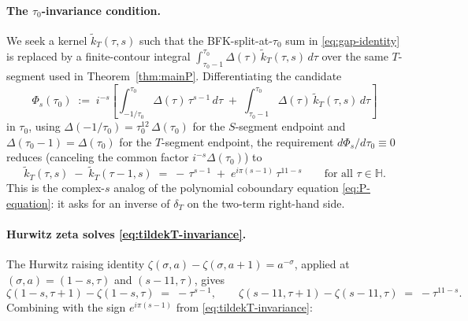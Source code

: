 \documentclass[11pt,letterpaper]{article}
\newcommand{\HH}{\mathbb{H}}
\begin{document}
\paragraph{The $\tau_0$-invariance condition.}
We seek a kernel $\widetilde{k}_T(\tau, s)$ such that the BFK-split-at-$\tau_0$ sum in \eqref{eq:gap-identity} is replaced by a finite-contour integral $\int_{\tau_0-1}^{\tau_0}\!\Delta(\tau)\,\widetilde{k}_T(\tau, s)\,d\tau$ over the same $T$-segment used in Theorem~\ref{thm:mainP}.  Differentiating the candidate
\[
  \Phi_s(\tau_0) \;:=\; i^{-s}\!\left[\int_{-1/\tau_0}^{\tau_0}\!\Delta(\tau)\,\tau^{s-1}\,d\tau \;+\; \int_{\tau_0-1}^{\tau_0}\!\Delta(\tau)\,\widetilde{k}_T(\tau, s)\,d\tau\right]
\]
in $\tau_0$, using $\Delta(-1/\tau_0) = \tau_0^{12}\,\Delta(\tau_0)$ for the $S$-segment endpoint and $\Delta(\tau_0 - 1) = \Delta(\tau_0)$ for the $T$-segment endpoint, the requirement $d\Phi_s/d\tau_0 \equiv 0$ reduces (canceling the common factor $i^{-s}\Delta(\tau_0)$) to
\begin{equation}\label{eq:tildekT-invariance}
  \widetilde{k}_T(\tau, s) \;-\; \widetilde{k}_T(\tau - 1, s) \;=\; -\,\tau^{s-1} \;+\; e^{i\pi(s-1)}\,\tau^{11-s}
  \qquad \text{for all } \tau \in \HH.
\end{equation}
This is the complex-$s$ analog of the polynomial coboundary equation \eqref{eq:P-equation}: it asks for an inverse of $\delta_T$ on the two-term right-hand side.

\paragraph{Hurwitz zeta solves \eqref{eq:tildekT-invariance}.}
The Hurwitz raising identity $\zeta(\sigma, a) - \zeta(\sigma, a + 1) = a^{-\sigma}$, applied at $(\sigma, a) = (1 - s, \tau)$ and $(s - 11, \tau)$, gives
\[
  \zeta(1 - s, \tau + 1) - \zeta(1 - s, \tau) \;=\; -\tau^{s-1},
  \qquad
  \zeta(s - 11, \tau + 1) - \zeta(s - 11, \tau) \;=\; -\tau^{11-s}.
\]
Combining with the sign $e^{i\pi(s-1)}$ from \eqref{eq:tildekT-invariance}:
\end{document}
